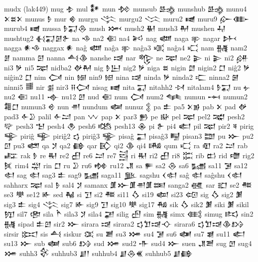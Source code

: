  mudx  (lak449)   
 mug  𒈮   
 mul  𒀯   
 mun  𒁵   
 munsub  𒈰   
 munshub  𒈰   
 munu4  𒉽𒊺𒉽    
 munus  𒊩   
 mur  𒄯   
 murgu  𒋞   
 murgu2  𒈱   
 muru2  𒉠   
 muru9  𒅎𒂂    
 murub4  𒉠   
 mussa  𒊩𒍑𒁲    
 mush  𒈲   
 mush2  𒈽   
 mush3  𒈹   
 mushen  𒄷   
 mushtug2  𒈬𒍑𒌆𒉿    
 na  𒈾   
 na2  𒈿   
 na4  𒎎   
 nag  𒅘   
 naga  𒉀   
 nagar  𒉄   
 nagga  𒀭𒈾    
 naggax  𒀭   
 naĝ  𒅘   
 naĝa  𒉀   
 naĝa3  𒄤   
 naĝa4  𒄣   
 nam  𒉆   
 nam2  𒉇   
 namma  𒇉   
 nanna  𒋀𒆠    
 nanshe  𒀏   
 nar  𒈜   
 ne  𒉈   
 ne2  𒉌   
 ni  𒉌   
 ni2  𒉎   
 ni3  𒃻   
 ni5  𒉈   
 nidba2  𒉻𒈹    
 nig  𒊩𒌨    
 nig2  𒃻   
 niga  𒊺   
 nigin  𒇔   
 nigin2  𒆸   
 niĝ2  𒃻   
 niĝin2  𒆸   
 nim  𒉏   
 nin  𒎏   
 nin9  𒎐   
 nina  𒀏   
 ninda  𒃻   
 ninda2  𒉒   
 ninna2  𒇧   
 ninni5  𒌃   
 nir  𒉪   
 nir3  𒍝𒉏    
 nisag  𒉠   
 nita  𒍑   
 nitahh2  𒀴   
 nitalam4  𒊩𒍑    
 nu  𒉡   
 nu2  𒈿   
 nu11  𒉢   
 nu12  𒇻   
 nud  𒈿   
 num  𒉏   
 num2  𒈝   
 numun  𒆰   
 numun2  𒍤𒆸    
 numun3  𒄴   
 nun  𒉣   
 nundum  𒅻   
 nunuz  𒉭   
 pa  𒉺   
 pa5  𒉽𒂊    
 pab  𒉽   
 pad  𒉻   
 pad3  𒅆𒊒    
 palil  𒅆𒁺    
 pan  𒉼   
 pap  𒉽   
 par3  𒁖   
 pe  𒄫   
 pel  𒉈   
 pel2  𒉋   
 pesh2  𒉾   
 pesh3  𒈠   
 pesh4  𒊯   
 pesh6  𒆓   
 pesh13  𒊴   
 pi  𒉿   
 pi4  𒅗   
 pil  𒉈   
 pir2  𒎕   
 pirig  𒊊   
 piriĝ  𒊊   
 piriĝ2  𒌓   
 piriĝ3  𒊌   
 pisaĝ  𒂷   
 pisaĝ3  𒋄   
 pisan3  𒊿   
 pu  𒁍   
 pu2  𒇥   
 pu3  𒅤   
 qa  𒋡   
 qa2  𒂵   
 qar  𒃼   
 qi2  𒆠   
 qi4  𒄄   
 qum  𒄣   
 ra  𒊏   
 ra2  𒁺   
 rab  𒊐   
 rak  𒊩   
 re  𒊑   
 re2  𒌷   
 re6  𒁺   
 re7  𒁻   
 ri  𒊑   
 ri2  𒌷   
 ri8  𒈶   
 rib  𒆗   
 rid  𒈩   
 rig2  𒍮   
 rim4  𒁽   
 rin  𒆸   
 ru  𒊒   
 ru6  𒂔   
 ru12  𒂗   
 sa  𒊓   
 sa2  𒁲   
 sa6  𒊷   
 sa11  𒋜   
 sa12  𒊕   
 sag  𒊕   
 sag3  𒉺   
 sag9  𒊷   
 saga11  𒆥   
 sagshu  𒌋𒊕    
 saĝ  𒊕   
 saĝshu  𒌋𒊕    
 sahharx  𒉈   
 sal  𒊩   
 sal4  𒋡   
 samanx  𒂠𒁍𒂠𒉣𒂠𒌅    
 sanga2  𒊫   
 sar  𒊬   
 se2  𒍣   
 se3  𒋧   
 se12  𒅊   
 sed  𒈻   
 si  𒋛   
 si2  𒍣   
 si11  𒋝   
 si19  𒆉   
 si23  𒄢   
 sig  𒋝   
 sig2  𒋠   
 sig3  𒉺   
 sig4  𒋞   
 sig7  𒅊   
 sig9  𒋛   
 sig10  𒋧   
 sig17  𒄀   
 sik  𒋝   
 sik2  𒋠   
 siki  𒋠   
 sikil  𒂖   
 sil7  𒂣   
 sila  𒋻   
 sila3  𒋡   
 sila4  𒃢   
 silig  𒍂   
 sim  𒉆   
 simx  𒍼   
 simug  𒌣   
 sin2  𒉆   
 sipad  𒉺𒇻    
 sir2  𒁍   
 sirara  𒀏   
 sirara2  𒌓𒈣𒀏𒋓    
 sirara6  𒌓𒈣𒀏𒆠𒋳    
 sirsir  𒁎   
 sis  𒋀   
 siskur  𒀬   
 su  𒋢   
 su3  𒋤   
 su4  𒋜   
 su6  𒅾   
 su7  𒇭   
 su11  𒅗   
 su13  𒁍   
 sub  𒅢   
 sub6  𒋳   
 sud  𒋤   
 sud2  𒋥   
 sud4  𒁍   
 suen  𒂗𒍪    
 sug  𒆹   
 sug4  𒋤   
 suhh3  𒄗   
 suhhub3  𒋗𒁹    
 suhhub4  𒋗𒁲𒌍    
 suhhub5  𒋗𒂵    
